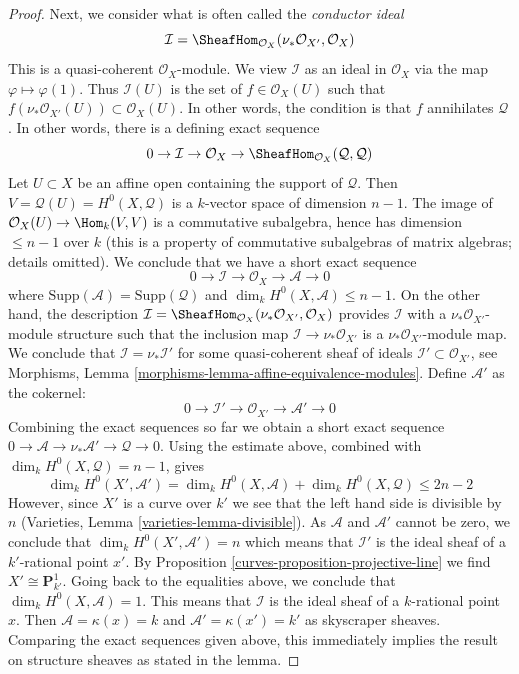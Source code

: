 \begin{proof}
\medskip\noindent
Next, we consider what is often called the {\it conductor ideal}
$$
\mathcal{I} = \SheafHom_{\mathcal{O}_X}(\nu_*\mathcal{O}_{X'}, \mathcal{O}_X)
$$
This is a quasi-coherent $\mathcal{O}_X$-module. We view $\mathcal{I}$
as an ideal in $\mathcal{O}_X$ via the map $\varphi \mapsto \varphi(1)$.
Thus $\mathcal{I}(U)$ is the set of $f \in \mathcal{O}_X(U)$ such that
$f \left(\nu_*\mathcal{O}_{X'}(U)\right) \subset \mathcal{O}_X(U)$. In
other words, the condition is that $f$ annihilates $\mathcal{Q}$.
In other words, there is a defining exact sequence
$$
0 \to \mathcal{I} \to \mathcal{O}_X \to
\SheafHom_{\mathcal{O}_X}(\mathcal{Q}, \mathcal{Q})
$$
Let $U \subset X$ be an affine open containing the support of $\mathcal{Q}$.
Then $V = \mathcal{Q}(U) = H^0(X, \mathcal{Q})$ is a $k$-vector space
of dimension $n - 1$. The image of
$\mathcal{O}_X(U) \to \Hom_k(V, V)$ is a commutative subalgebra,
hence has dimension $\leq n - 1$ over $k$ (this is a property of
commutative subalgebras of matrix algebras; details omitted).
We conclude that we have a short exact sequence
$$
0 \to \mathcal{I} \to \mathcal{O}_X \to \mathcal{A} \to 0
$$
where $\text{Supp}(\mathcal{A}) = \text{Supp}(\mathcal{Q})$
and $\dim_k H^0(X, \mathcal{A}) \leq n - 1$.
On the other hand, the description
$\mathcal{I} = \SheafHom_{\mathcal{O}_X}(\nu_*\mathcal{O}_{X'}, \mathcal{O}_X)$
provides $\mathcal{I}$ with a $\nu_*\mathcal{O}_{X'}$-module structure
such that the inclusion map $\mathcal{I} \to \nu_*\mathcal{O}_{X'}$
is a $\nu_*\mathcal{O}_{X'}$-module map.
We conclude that $\mathcal{I} = \nu_*\mathcal{I}'$
for some quasi-coherent sheaf of ideals
$\mathcal{I}' \subset \mathcal{O}_{X'}$, see
Morphisms, Lemma \ref{morphisms-lemma-affine-equivalence-modules}.
Define $\mathcal{A}'$ as the cokernel:
$$
0 \to \mathcal{I}' \to \mathcal{O}_{X'} \to \mathcal{A}' \to 0
$$
Combining the exact sequences so far we obtain a short exact sequence
$0 \to \mathcal{A} \to \nu_*\mathcal{A}' \to \mathcal{Q} \to 0$.
Using the estimate above,
combined with $\dim_k H^0(X, \mathcal{Q}) = n - 1$, gives
$$
\dim_k H^0(X', \mathcal{A}') =
\dim_k H^0(X, \mathcal{A}) + \dim_k H^0(X, \mathcal{Q}) \leq 2 n - 2
$$
However, since $X'$ is a curve over $k'$ we see that
the left hand side is divisible by $n$
(Varieties, Lemma \ref{varieties-lemma-divisible}).
As $\mathcal{A}$ and $\mathcal{A}'$ cannot be zero, we conclude that
$\dim_k H^0(X', \mathcal{A}') = n$ which means that $\mathcal{I}'$
is the ideal sheaf of a $k'$-rational point $x'$.
By Proposition \ref{curves-proposition-projective-line}
we find $X' \cong \mathbf{P}^1_{k'}$.
Going back to the equalities above, we conclude that
$\dim_k H^0(X, \mathcal{A}) = 1$. This
means that $\mathcal{I}$ is the ideal sheaf of a
$k$-rational point $x$. Then $\mathcal{A} = \kappa(x) = k$
and $\mathcal{A}' = \kappa(x') = k'$ as skyscraper sheaves.
Comparing the exact sequences given above,
this immediately implies the result on structure sheaves
as stated in the lemma.
\end{proof}

